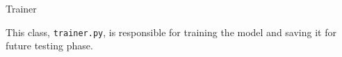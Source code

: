 \begin{section}{Trainer}
    \par This class, \texttt{trainer.py}, is responsible for training the model and saving it for future testing phase.
    
\end{section}
\clearpage